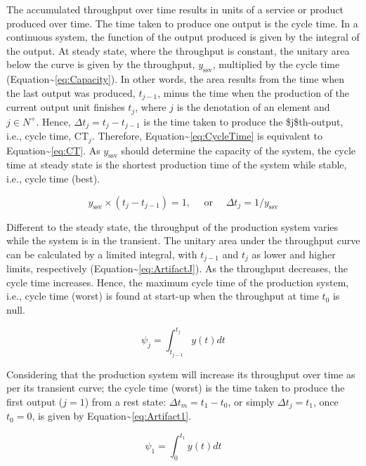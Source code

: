 \documentclass{article}
\begin{document}
\begin{enumerate}
\begin{enumerate}
The accumulated throughput over time results in units of a service or product produced over time.
The time taken to produce one output is the cycle time.
In a continuous system, the function of the output produced is given by the integral of the output.
At steady state, where the throughput is constant, the unitary area below the curve is given by the throughput, \(y_{\mbox{ssv}}\), multiplied by the cycle time (Equation\textasciitilde{}\ref{eq:Capacity}).
In other words, the area results from the time when the last output was produced, \(t_{j-1}\), minus the time when the production of the current output unit finishes \(t_j\), where \(j\) is the denotation of an element and \(j \in N^+\).
Hence, \(\Delta t_j=t_j-t_{j-1}\) is the time taken to produce the \$j\$th-output, i.e., cycle time, \(\mbox{CT}_j\).
Therefore, Equation\textasciitilde{}\ref{eq:CycleTime} is equivalent to Equation\textasciitilde{}\ref{eq:CT}.
As \(y_{\mbox{ssv}}\) should determine the capacity of the system, the cycle time at steady state is the shortest production time of the system while stable, i.e., cycle time (best).

\begin{equation}\label{eq:CycleTime}
	y_{\mbox{ssv}} \times (t_j-t_{j-1}) = 1, \quad\mbox{ or }\quad \Delta t_j = 1/y_{\mbox{ssv}}
\end{equation}

Different to the steady state, the throughput of the production system varies while the system is in the transient.
The unitary area under the throughput curve can be calculated by a limited integral, with \(t_{j-1}\) and \(t_j\) as lower and higher limits, respectively (Equation\textasciitilde{}\ref{eq:ArtifactJ}).
As the throughput decreases, the cycle time increases.
Hence, the maximum cycle time of the production system, i.e., cycle time (worst) is found at start-up when the throughput at time \(t_0\) is null.

\begin{equation}\label{eq:ArtifactJ}
	\psi_j = \int_{t_{j-1}}^{t_j} y(t)dt
\end{equation}

Considering that the production system will increase its throughput over time as per its transient curve; the cycle time (worst) is the time taken to produce the first output (\(j=1\)) from a rest state: \(\Delta t_m = t_1-t_0\), or simply \(\Delta t_j = t_1\), once \(t_0 = 0\), is given by Equation\textasciitilde{}\ref{eq:Artifact1}.

\begin{equation}\label{eq:Artifact1}
	\psi_1 = \int_{0}^{t_1} y(t)dt
\end{equation}


\end{enumerate}
\end{enumerate}
\end{document}
